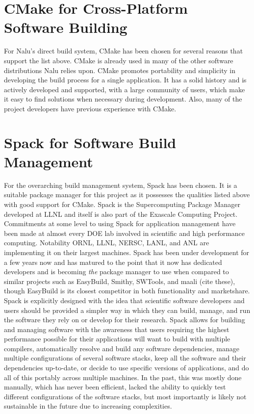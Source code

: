 \documentclass[12pt, oneside]{article}
\begin{document}
\section{CMake for Cross-Platform Software Building}
For Nalu's direct build system, CMake has been chosen for several reasons that support the list above. CMake is already used in many of the other software distributions Nalu relies upon. CMake promotes portability and simplicity in developing the build process for a single application. It has a solid history and is actively developed and supported, with a large community of users, which make it easy to find solutions when necessary during development. Also, many of the project developers have previous experience with CMake.

\section{Spack for Software Build Management}
For the overarching build management system, Spack has been chosen. It is a suitable package manager for this project as it possesses the qualities listed above with good support for CMake. Spack is the Supercomputing Package Manager developed at LLNL and itself is also part of the Exascale Computing Project. Commitments at some level to using Spack for application management have been made at almost every DOE lab involved in scientific and high performance computing. Notability ORNL, LLNL, NERSC, LANL, and ANL are implementing it on their largest machines. Spack has been under development for a few years now and has matured to the point that it now has dedicated developers and is becoming \textit{the} package manager to use when compared to similar projects such as EasyBuild, Smithy, SWTools, and maali (cite these), though EasyBuild is its closest competitor in both functionality and marketshare. Spack is explicitly designed with the idea that scientific software developers and users should be provided a simpler way in which they can build, manage, and run the software they rely on or develop for their research. Spack allows for building and managing software with the awareness that users requiring the highest performance possible for their applications will want to build with multiple compilers, automatically resolve and build any software dependencies, manage multiple configurations of several software stacks, keep all the software and their dependencies up-to-date, or decide to use specific versions of applications, and do all of this portably across multiple machines. In the past, this was mostly done manually, which has never been efficient, lacked the ability to quickly test different configurations of the software stacks, but most importantly is likely not sustainable in the future due to increasing complexities.
\end{document}
